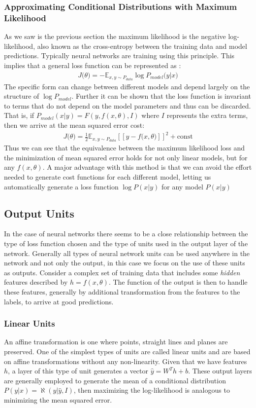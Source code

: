 \documentclass[12pt]{extarticle}
\numberwithin{equation}{section}
\begin{document}
	\subsubsection{Approximating Conditional Distributions with Maximum Likelihood}
	As we saw is the previous section the maximum likelihood is the negative log-likelihood, also known as the cross-entropy between the training data and model predictions. Typically neural networks are training using this principle. This implies that a general loss function can be represented as :
	\begin{align}
	J\big(\theta\big) = -\mathbb{E}_{x,{y \sim P_{data}}}\log P_{model}\big(y|x\big)
	\end{align}
	The specific form can change between different models and depend largely on the structure of $\log P_{model}$. Further it can be shown that the loss function is invariant to terms that do not depend on the model parameters and thus can be discarded. That is, if $P_{model}(x | y) = F(y, f(x,\theta), I)$ where $I$ represents the extra terms, then we arrive at the mean squared error cost:
	\begin{align}
	J\big(\theta\big) = \frac{1}{2} \mathbb{E}_{x,{y \sim P_{data}}} [\![y - f\big(x, \theta\big)]\!]^2 + \text{const} \label{eq:mse_loss}
	\end{align}
	Thus we can see that the equivalence between the maximum likelihood loss and the minimization of mean squared error holds for not only linear models, but for any $f(x,\theta)$. A major advantage with this method is that we can avoid the effort needed to generate cost functions for each different model, letting us automatically generate a loss function $\log P(x | y)$ for any model $P(x | y)$
	\subsection{Output Units}
	In the case of neural networks there seems to be a close relationship between the type of loss function chosen and the type of units used in the output layer of the network. Generally all types of neural network units can be used anywhere in the network and not only the output, in this case we focus on the use of these units as outputs. Consider a complex set of training data that includes some \textit{hidden} features described by $h = f(x,\theta)$. The function of the output is then to handle these features, generally by additional transformation from the features to the labels, to arrive at good predictions.
	\subsubsection{Linear Units}\label{linear_unit}
	An affine transformation is one where points, straight lines and planes are preserved. One of the simplest types of units are called linear units and are based on affine transformations without any non-linearity. Given that we have features $h$, a layer of this type of unit generates a vector $\hat{y} = W^T h + b$. These output layers are generally employed to generate the mean of a conditional distribution $P(y | x) = \aleph(y | \hat{y}, I)$, then maximizing the log-likelihood is analogous to minimizing the mean squared error.
\end{document}
